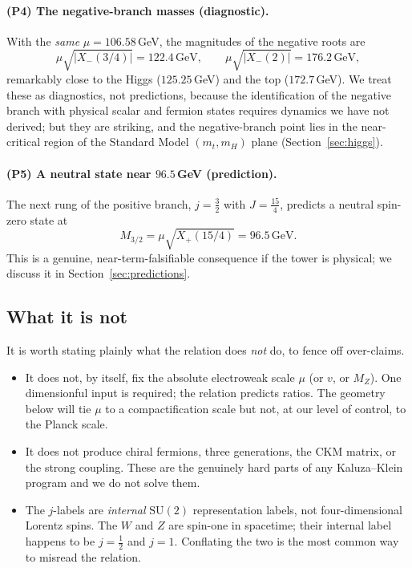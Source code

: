 \documentclass[11pt]{article}
\theoremstyle{plain}
\theoremstyle{definition}
\newcommand{\Xp}{X_{+}}
\newcommand{\Xm}{X_{-}}
\newcommand{\half}{\tfrac12}
\newcommand{\SU}{\mathrm{SU}}
\begin{document}
\paragraph{(P4) The negative-branch masses (diagnostic).}
With the \emph{same} $\mu=106.58\,$GeV, the magnitudes of the negative
roots are
\begin{equation}
\mu\sqrt{|\Xm(3/4)|}=122.4\,\text{GeV},
\qquad
\mu\sqrt{|\Xm(2)|}=176.2\,\text{GeV},
\end{equation}
remarkably close to the Higgs ($125.25\,$GeV) and the top
($172.7\,$GeV). We treat these as diagnostics, not predictions, because the
identification of the negative branch with physical scalar and fermion
states requires dynamics we have not derived; but they are striking, and the
negative-branch point lies in the near-critical region of the Standard Model
$(m_t,m_H)$ plane (Section~\ref{sec:higgs}).

\paragraph{(P5) A neutral state near $96.5\,$GeV (prediction).}
The next rung of the positive branch, $j=\tfrac32$ with $J=\tfrac{15}4$,
predicts a neutral spin-zero state at
\begin{equation}
M_{3/2}=\mu\sqrt{\Xp(15/4)}=96.5\,\text{GeV}.
\end{equation}
This is a genuine, near-term-falsifiable consequence if the tower is
physical; we discuss it in Section~\ref{sec:predictions}.

\subsection{What it is not}

It is worth stating plainly what the relation does \emph{not} do, to fence
off over-claims.

\begin{itemize}
\item It does not, by itself, fix the absolute electroweak scale $\mu$ (or
$v$, or $M_Z$). One dimensionful input is required; the relation predicts
ratios. The geometry below will tie $\mu$ to a compactification scale but
not, at our level of control, to the Planck scale.
\item It does not produce chiral fermions, three generations, the CKM
matrix, or the strong coupling. These are the genuinely hard parts of any
Kaluza--Klein program and we do not solve them.
\item The $j$-labels are \emph{internal} $\SU(2)$ representation labels, not
four-dimensional Lorentz spins. The $W$ and $Z$ are spin-one in spacetime;
their internal label happens to be $j=\half$ and $j=1$. Conflating the two
is the most common way to misread the relation.
\end{itemize}
\end{document}

